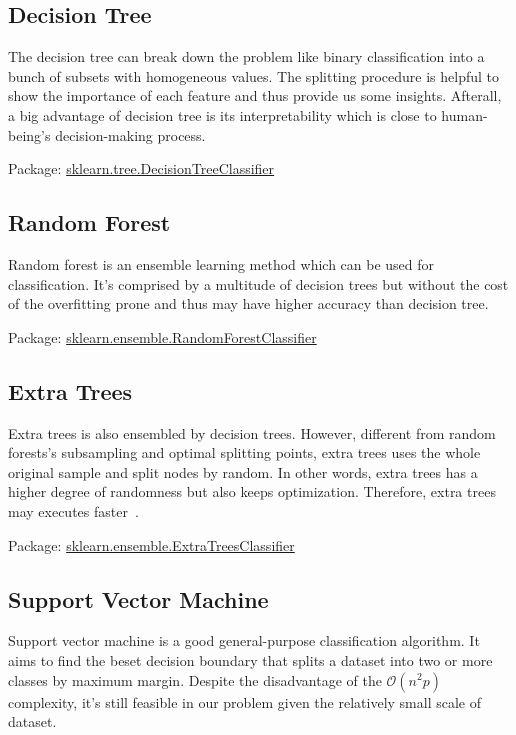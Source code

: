 \documentclass[10pt,twocolumn,letterpaper]{article}
\begin{document}
\subsection{Decision Tree}
The decision tree can break down the problem like binary classification into a bunch of subsets with homogeneous values. The splitting procedure is helpful to show the importance of each feature and thus provide us some insights. Afterall, a big advantage of decision tree is its interpretability which is close to human-being's decision-making process.

Package: \href{https://scikit-learn.org/stable/modules/generated/sklearn.tree.DecisionTreeClassifier.html}{sklearn.tree.DecisionTreeClassifier}

\subsection{Random Forest}
Random forest is an ensemble learning method which can be used for classification. It's comprised by a multitude of decision trees but without the cost of the overfitting prone and thus may have higher accuracy than decision tree.

Package: \href{https://scikit-learn.org/stable/modules/generated/sklearn.ensemble.RandomForestClassifier.html}{sklearn.ensemble.RandomForestClassifier}

\subsection{Extra Trees}
Extra trees is also ensembled by decision trees. However, different from random forests's subsampling and optimal splitting points, extra trees uses the whole original sample and split nodes by random. In other words, extra trees has a higher degree of randomness but also keeps optimization. Therefore, extra trees may executes faster~\cite{geurts2006}.

Package: \href{https://scikit-learn.org/stable/modules/generated/sklearn.ensemble.ExtraTreesClassifier.html}{sklearn.ensemble.ExtraTreesClassifier}

\subsection{Support Vector Machine}
Support vector machine is a good general-purpose classification algorithm. It aims to find the beset decision boundary that splits a dataset into two or more classes by maximum margin. Despite the disadvantage of the $\mathcal{O}(n^2 p)$ complexity, it's still feasible in our problem given the relatively small scale of dataset. 
\end{document}
